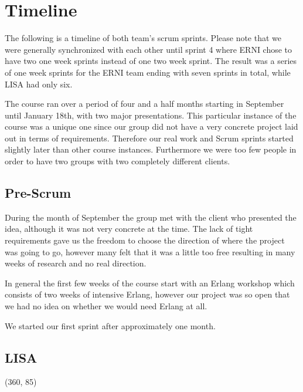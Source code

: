 \section {Timeline}

The following is a timeline of both team's scrum sprints. Please note that we were generally synchronized with each other until sprint 4 where ERNI chose to have two one week sprints instead of one two week sprint. The result was a series of one week sprints for the ERNI team ending with seven sprints in total, while LISA had only six.

The course ran over a period of four and a half months starting in September until January 18th, with two major presentations. This particular instance of the course was a unique one since our group did not have a very concrete project laid out in terms of requirements. Therefore our real work and Scrum sprints started slightly later than other course instances. Furthermore we were too few people in order to have two groups
with two completely different clients.

\subsection{Pre-Scrum}
During the month of September the group met with the client who presented the idea, although it was not very concrete at the time. The lack of tight requirements gave us the freedom to choose the direction of where the project was going to go, however many felt that it was a little too free resulting in many weeks of research and no real direction. 

In general the first few weeks of the course start with an Erlang workshop which consists of two weeks of intensive Erlang, however our project was so open that we had no idea on whether we would need Erlang at all.

We started our first sprint after approximately one month.

\subsection {LISA}
\framebox(360, 85){
}

